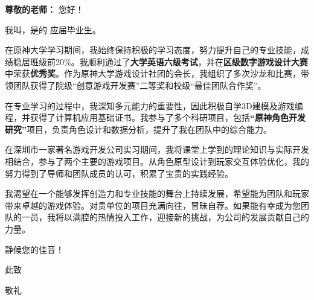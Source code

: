 {
	\songti %
	\setlength\parskip{8pt} %
	
	\textbf{尊敬的老师：}
	\pind 您好！
	
	\pind 我叫\checkCoverLetterName，是\textbf{\theUniversityName \theCollegeName}的 \theSession 应届毕业生。
	
	\pind 在原神大学学习期间，我始终保持积极的学习态度，努力提升自己的专业技能，成绩稳居班级前20\%。我顺利通过了\textbf{大学英语六级考试}，并在\textbf{区级数字游戏设计大赛}中荣获\textbf{优秀奖}。作为原神大学游戏设计社团的会长，我组织了多次沙龙和比赛，带领团队获得了院级“创意游戏开发赛”二等奖和校级“最佳团队合作奖”。
	
	\pind 在专业学习的过程中，我深知多元能力的重要性，因此积极自学3D建模及游戏编程，并获得了计算机应用基础证书。我参与了多个科研项目，包括\textbf{“原神角色开发研究”}项目，负责角色设计和数据分析，提升了我在团队中的综合能力。
	
	\pind 在深圳市一家著名游戏开发公司实习期间，我将课堂上学到的理论知识与实际开发相结合，参与了两个主要的游戏项目。从角色原型设计到玩家交互体验优化，我的努力得到了导师和团队成员的认可，积累了宝贵的实践经验。
	
	\pind 我渴望在一个能够发挥创造力和专业技能的舞台上持续发展，希望能为团队和玩家带来卓越的游戏体验。对贵单位的项目充满向往，冒昧自荐。如果能有幸成为您团队的一员，我将以满腔的热情投入工作，迎接新的挑战，为公司的发展贡献自己的力量。
	
	
	\pind 静候您的佳音！
	
	\pind 此致
	
	敬礼
	
	\vspace*{12pt}
	\begin{flushright}
	\end{flushright}
}